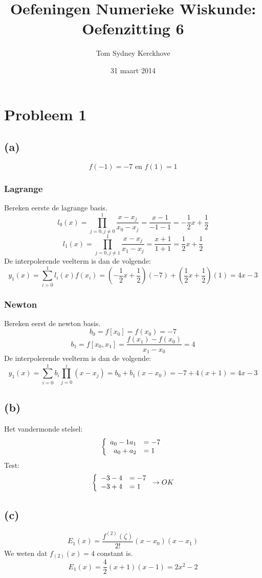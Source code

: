 \documentclass[12pt,a4paper]{article}
\author{Tom Sydney Kerckhove}
\title{Oefeningen Numerieke Wiskunde:\\ Oefenzitting 6}
\date{31 maart 2014}
\begin{document}
\maketitle

\section{Probleem 1}
\subsection*{(a)}
\[
f(-1) = -7 \text{ en } f(1) = 1
\]
\subsubsection*{Lagrange}
Bereken eerste de lagrange basis.
\[
l_0(x) = \prod_{j=0,j\neq 0}^{1}\frac{x-x_j}{x_0-x_j} = \frac{x-1}{-1-1} = -\frac{1}{2}x + \frac{1}{2}
\]
\[
l_1(x) = \prod_{j=0,j\neq 1}^{1}\frac{x-x_j}{x_1-x_j} = \frac{x+1}{1+1} = \frac{1}{2}x + \frac{1}{2}
\]
De interpolerende veelterm is dan de volgende:
\[
y_{1}(x) = \sum_{i=0}^{1}l_{i}(x)f(x_i)
= \left(-\frac{1}{2}x + \frac{1}{2}\right)(-7)
+ \left(\frac{1}{2}x + \frac{1}{2}\right)(1)
= 4x-3
\]

\subsubsection*{Newton}
Bereken eerst de newton basis.
\[
b_{0} = f[x_0] = f(x_{0}) = -7
\]
\[
b_{1} = f[x_0,x_1] = \frac{f(x_1)-f(x_0)}{x_1-x_0} = 4
\]
De interpolerende veelterm is dan de volgende:
\[
y_{1}(x) = \sum_{i=0}^1b_i\prod_{j=0}^{i}(x-x_j) = b_0 + b_1(x-x_0) = -7 + 4(x+1) = 4x-3
\]


\subsection*{(b)}
Het vandermonde stelsel:
\[
\left\{
\begin{array}{r l}
a_0 - 1a_1 &= -7\\
a_0 +  a_2 &= 1\\
\end{array}
\right.
\]
Test:
\[
\left\{
\begin{array}{r l}
-3 - 4 &= -7\\
-3 + 4 &= 1\\
\end{array}
\right.
\rightarrow OK
\]
\subsection*{(c)}
\[
E_1(x) = \frac{f^{(2)}(\zeta)}{2!}(x-x_0)(x-x_1)
\]
We weten dat $f_{(2)}(x) = 4$ constant is.
\[
E_1(x) = \frac{4}{2}(x+1)(x-1) = 2x^2-2
\]
\end{document}
